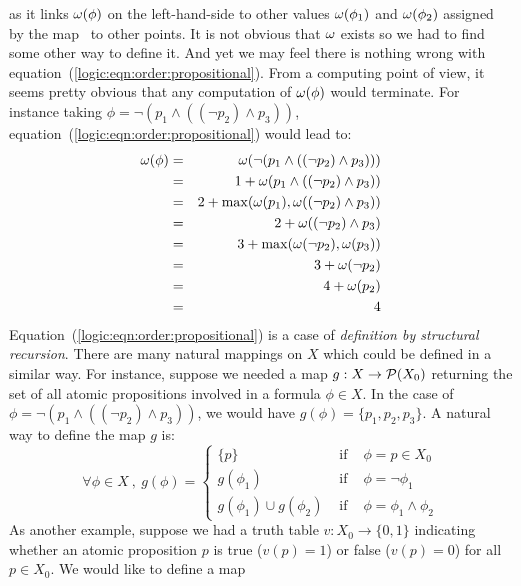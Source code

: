 as it links $\mbox{$\omega$}(\phi)$ on the left-hand-side to other values
$\mbox{$\omega$}(\phi_{1})$ and $\mbox{$\omega$}(\phi_{2})$ assigned by the map \om\ to
other points. It is not obvious that $\mbox{$\omega$}$ exists so we had to find
some other way to define it. And yet we may feel there is nothing
wrong with equation~(\ref{logic:eqn:order:propositional}). From a
computing point of view, it seems pretty obvious that any
computation of $\mbox{$\omega$}(\phi)$ would terminate. For instance taking
$\phi=\lnot(p_{1}\land((\lnot p_{2})\land p_{3}))$,
equation~(\ref{logic:eqn:order:propositional}) would lead to:
    \begin{eqnarray*}
        \mbox{$\omega$}(\phi)&=&\mbox{$\omega$}(\lnot(p_{1}\land((\lnot p_{2})\land p_{3})))\\
        &=&1+\mbox{$\omega$}(p_{1}\land((\lnot p_{2})\land p_{3}))\\
        &=&2+\max(\mbox{$\omega$}(p_{1}),\mbox{$\omega$}((\lnot p_{2})\land p_{3}))\\
        &=&2+\mbox{$\omega$}((\lnot p_{2})\land p_{3})\\
        &=&3+\max(\mbox{$\omega$}(\lnot p_{2}),\mbox{$\omega$}(p_{3}))\\
        &=&3+\mbox{$\omega$}(\lnot p_{2})\\
        &=&4+\mbox{$\omega$}(p_{2})\\
        &=&4
    \end{eqnarray*}
Equation~(\ref{logic:eqn:order:propositional}) is a case of {\em
definition by structural recursion}. There are many natural mappings
on $X$ which could be defined in a similar way. For instance,
suppose we needed a map $g:X\to{\cal P}(X_{0})$ returning the set of
all atomic propositions involved in a formula $\phi\in X$. In the
case of $\phi=\lnot(p_{1}\land((\lnot p_{2})\land p_{3}))$, we would
have $g(\phi)=\{p_{1},p_{2},p_{3}\}$. A natural way to define the
map $g$ is:
    \begin{equation}\label{logic:eqn:set:propositional}
    \forall\phi\in X\ ,\ g(\phi)=\left\{
                    \begin{array}{lcl}
                    \{p\}&\mbox{\ if\ }&\phi=p\in X_{0}\\
                    g(\phi_{1})&\mbox{\ if\ }&\phi=\lnot\phi_{1}\\
                    g(\phi_{1})\cup g(\phi_{2})&\mbox{\ if\ }&\phi=\phi_{1}\land\phi_{2}
                    \end{array}\right.
    \end{equation}
As another example, suppose we had a truth table $v:X_{0}\to\{0,1\}$
indicating whether an atomic proposition $p$ is true ($v(p)=1$) or
false ($v(p)=0$) for all $p\in X_{0}$. We would like to define a map
